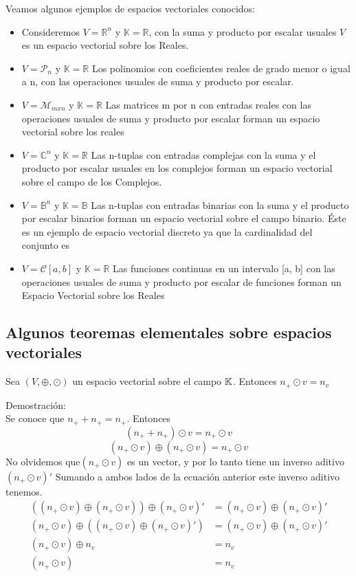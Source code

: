 Veamos algunos ejemplos de espacios vectoriales conocidos:
\begin{itemize}
    \item Consideremos $V=\mathbb{R}^n$ y $\mathbb{K}=\mathbb{R}$, con la suma y producto por escalar usuales $V$ es un espacio vectorial sobre los Reales.
    \item $V=\mathcal{P}_n$ y $\mathbb{K}=\mathbb{R}$ Los polinomios con coeficientes reales de grado menor o igual a n, con las operaciones usuales de suma y producto por escalar.
    \item $V=\mathcal{M}_{mxn}$ y $\mathbb{K}=\mathbb{R}$ Las matrices m por n con entradas reales con las operaciones usuales de suma y producto por escalar forman un espacio vectorial sobre los reales
    \item $V=\mathbb{C}^n$ y $\mathbb{K}=\mathbb{R}$ Las n-tuplas con entradas complejas con la suma y el producto por escalar usuales en los complejos forman un espacio vectorial sobre el campo de los Complejos.
    \item  $V=\mathbb{B}^n$ y $\mathbb{K}=\mathbb{B}$ Las n-tuplas con entradas binarias con la suma y el producto por escalar binarios forman un espacio vectorial sobre el campo binario. Éste es un ejemplo de espacio vectorial discreto ya que la cardinalidad del conjunto es
    \item $V=\mathcal{C}[a,b]$ y $\mathbb{K}=\mathbb{R}$ Las funciones continuas en un intervalo [a, b] con las operaciones usuales de suma y producto por escalar de funciones forman un Espacio Vectorial sobre los Reales
\end{itemize}


\subsection{Algunos teoremas elementales sobre espacios vectoriales}
\begin{theorem}
Sea $(V,\oplus,\odot)$ un espacio vectorial sobre el campo $\mathbb{K}$. Entonces $n_+\odot v=n_v$
\end{theorem}
Demostración:
~\\

Se conoce que $n_+ + n_+=n_+$. Entonces
\[(n_++n_+ )\odot v=n_+\odot v\]
\[(n_+\odot v)\oplus (n_+\odot v)=n_+\odot v\]
No olvidemos que$ (n_+\odot v)$ es un vector, y por lo tanto tiene un inverso aditivo $(n_+\odot v)'$
Sumando a ambos lados de la ecuación anterior este inverso aditivo tenemos.
\begin{align*}
    ((n_+\odot v)\oplus (n_+\odot v))\oplus (n_+\odot v)'&=(n_+\odot v)\oplus (n_+\odot v)'\\
    (n_+\odot v)\oplus ((n_+\odot v)\oplus (n_+\odot v)' )&=(n_+\odot v)\oplus (n_+\odot v)'\\
    (n_+\odot v)\oplus n_v&=n_v\\
    (n_+\odot v)&=n_v
\end{align*}


